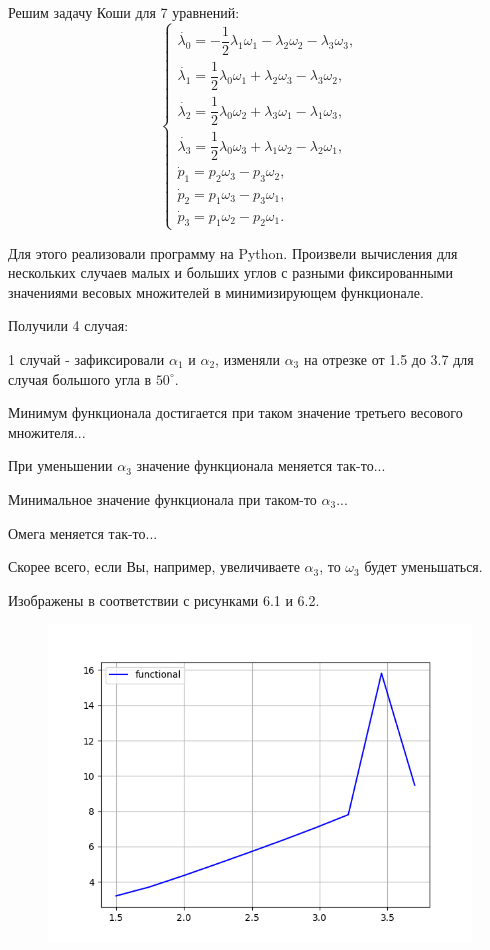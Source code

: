 \documentclass[14pt]{extreport}
\begin{document}
Решим задачу Коши для 7 уравнений:
\begin{equation}
\begin{cases}
\dot{\lambda_{0}} = -\dfrac{1}{2} \lambda_{1}\omega_{1} - \lambda_{2}\omega_{2} - \lambda_{3}\omega_{3},\\
\dot{\lambda_{1}} = \dfrac{1}{2} \lambda_{0}\omega_{1} + \lambda_{2}\omega_{3} - \lambda_{3}\omega_{2},\\
\dot{\lambda_{2}} = \dfrac{1}{2} \lambda_{0}\omega_{2} + \lambda_{3}\omega_{1} - \lambda_{1}\omega_{3},\\
\dot{\lambda_{3}} = \dfrac{1}{2} \lambda_{0}\omega_{3} + \lambda_{1}\omega_{2} - \lambda_{2}\omega_{1},\\
\dot{p}_1 = p_2 \omega_3 - p_3 \omega_2,\\
\dot{p}_2 = p_1 \omega_3 - p_3 \omega_1,\\
\dot{p}_3 = p_1 \omega_2 - p_2 \omega_1.
\end{cases}
\end{equation}

Для этого реализовали программу на Python. Произвели вычисления для нескольких случаев малых и больших углов с разными фиксированными значениями весовых множителей в минимизирующем функционале.

Получили 4 случая:

1 случай - зафиксировали $\alpha_1$ и $\alpha_2$, изменяли $\alpha_3$ на отрезке от 1.5 до 3.7 для случая большого угла в $50^{\circ}$.

Минимум функционала достигается при таком значение третьего весового множителя...

При уменьшении $\alpha_3$ значение функционала меняется так-то...

Минимальное значение функционала при таком-то $\alpha_3$...

Омега меняется так-то...

Скорее всего, если Вы, например, увеличиваете $\alpha_3$, то $\omega_3$ будет уменьшаться.

Изображены в соответствии с рисунками 6.1 и 6.2.

\begin{figure}[H]
\center\includegraphics[scale=0.8]{fig/functional_1_5-3_7_50.png}
\caption{}
\end{figure}
\end{document}
